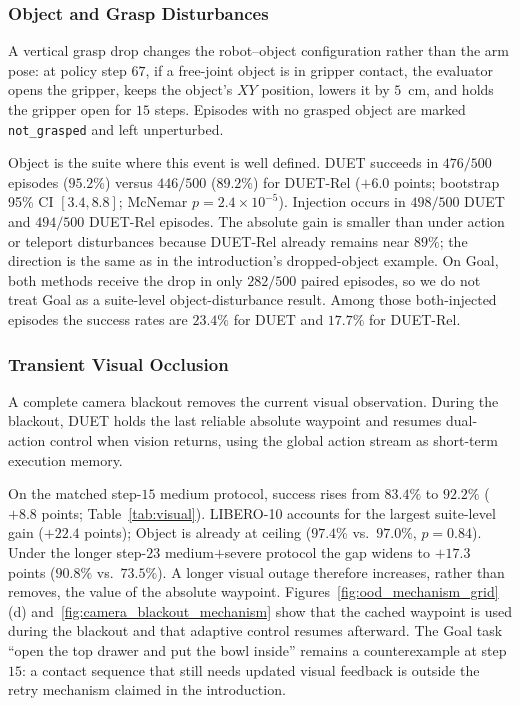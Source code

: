 \documentclass[letterpaper, 10 pt, conference]{ieeeconf}
\begin{document}
\subsubsection{Object and Grasp Disturbances}
A vertical grasp drop changes the robot--object configuration rather than the arm pose: at policy step $67$, if a free-joint object is in gripper contact, the evaluator opens the gripper, keeps the object's $XY$ position, lowers it by $5$~cm, and holds the gripper open for $15$ steps. Episodes with no grasped object are marked \texttt{not\_grasped} and left unperturbed.

Object is the suite where this event is well defined. DUET succeeds in $476/500$ episodes ($95.2\%$) versus $446/500$ ($89.2\%$) for DUET-Rel ($+6.0$ points; bootstrap 95\% CI $[3.4,8.8]$; McNemar $p{=}2.4{\times}10^{-5}$). Injection occurs in $498/500$ DUET and $494/500$ DUET-Rel episodes. The absolute gain is smaller than under action or teleport disturbances because DUET-Rel already remains near $89\%$; the direction is the same as in the introduction's dropped-object example. On Goal, both methods receive the drop in only $282/500$ paired episodes, so we do not treat Goal as a suite-level object-disturbance result. Among those both-injected episodes the success rates are $23.4\%$ for DUET and $17.7\%$ for DUET-Rel.

\subsubsection{Transient Visual Occlusion}
A complete camera blackout removes the current visual observation. During the blackout, DUET holds the last reliable absolute waypoint and resumes dual-action control when vision returns, using the global action stream as short-term execution memory.

On the matched step-$15$ medium protocol, success rises from $83.4\%$ to $92.2\%$ ($+8.8$ points; Table~\ref{tab:visual}). LIBERO-10 accounts for the largest suite-level gain ($+22.4$ points); Object is already at ceiling ($97.4\%$ vs.\ $97.0\%$, $p{=}0.84$). Under the longer step-$23$ medium$+$severe protocol the gap widens to $+17.3$ points ($90.8\%$ vs.\ $73.5\%$). A longer visual outage therefore increases, rather than removes, the value of the absolute waypoint. Figures~\ref{fig:ood_mechanism_grid}(d) and~\ref{fig:camera_blackout_mechanism} show that the cached waypoint is used during the blackout and that adaptive control resumes afterward. The Goal task ``open the top drawer and put the bowl inside'' remains a counterexample at step $15$: a contact sequence that still needs updated visual feedback is outside the retry mechanism claimed in the introduction.
\end{document}

